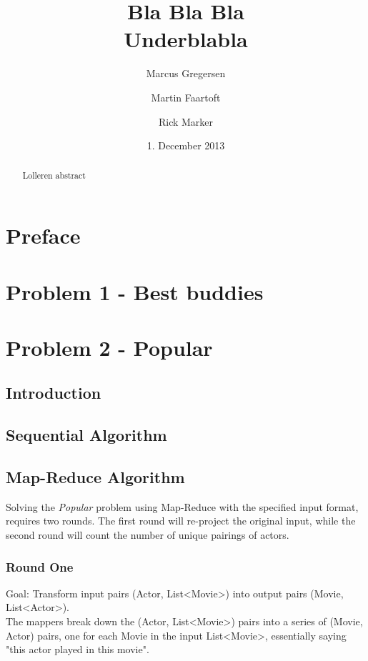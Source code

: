 \documentclass[a4paper,11pt]{article}
\begin{document}
\date{1. December 2013}
\title{Bla Bla Bla\\Underblabla}
\author{Marcus Gregersen\and Martin Faartoft\and Rick Marker}
\clearpage\maketitle
\thispagestyle{empty}
\begin{abstract}
Lolleren abstract
\end{abstract}
\newpage
\setcounter{page}{1}
\section{Preface}
\section{Problem 1 - Best buddies}

\section{Problem 2 - Popular}
\subsection{Introduction}
\subsection{Sequential Algorithm}
\label{sub:sequential}
\subsection{Map-Reduce Algorithm}
\label{sub:map-reduce}
Solving the \emph{Popular} problem using Map-Reduce with the specified input format, requires two rounds. The first round will re-project the original input, while the second round will count the number of unique pairings of actors.

\subsubsection{Round One}
Goal: Transform input pairs (Actor, List<Movie>) into output pairs (Movie, List<Actor>).\\

The mappers break down the (Actor, List<Movie>) pairs into a series of (Movie, Actor) pairs, one for each Movie in the input List<Movie>, essentially saying "this actor played in this movie".\\
\end{document}
